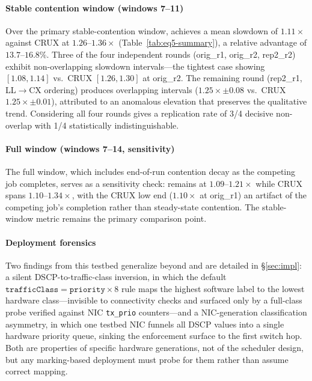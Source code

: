 \paragraph{Stable contention window (windows 7--11)}
Over the primary stable-contention window, \Name achieves a mean slowdown of $1.11\times$ against CRUX at $1.26$--$1.36\times$ (Table~\ref{tab:eq5-summary}), a relative advantage of $13.7$--$16.8\%$. Three of the four independent rounds (orig\_r1, orig\_r2, rep2\_r2) exhibit non-overlapping slowdown intervals---the tightest case showing \Name $[1.08, 1.14]$ vs.\ CRUX $[1.26, 1.30]$ at orig\_r2. The remaining round (rep2\_r1, LL$\rightarrow$CX ordering) produces overlapping intervals (\Name $1.25\times \pm 0.08$ vs.\ CRUX $1.25\times \pm 0.01$), attributed to an anomalous \Name elevation that preserves the qualitative trend. Considering all four rounds gives a replication rate of 3/4 decisive non-overlap with 1/4 statistically indistinguishable.

\paragraph{Full window (windows 7--14, sensitivity)}
The full window, which includes end-of-run contention decay as the competing job completes, serves as a sensitivity check: \Name remains at $1.09$--$1.21\times$ while CRUX spans $1.10$--$1.34\times$, with the CRUX low end ($1.10\times$ at orig\_r1) an artifact of the competing job's completion rather than steady-state contention. The stable-window metric remains the primary comparison point.

\paragraph{Deployment forensics}
Two findings from this testbed generalize beyond \Name and are detailed in \S\ref{sec:impl}: a silent DSCP-to-traffic-class inversion, in which the default $\texttt{trafficClass} = \mathtt{priority} \times 8$ rule maps the highest software label to the lowest hardware class---invisible to connectivity checks and surfaced only by a full-class probe verified against NIC \texttt{tx\_prio} counters---and a NIC-generation classification asymmetry, in which one testbed NIC funnels all DSCP values into a single hardware priority queue, sinking the enforcement surface to the first switch hop. Both are properties of specific hardware generations, not of the scheduler design, but any marking-based deployment must probe for them rather than assume correct mapping.

